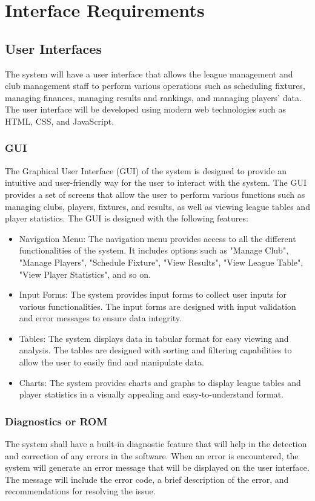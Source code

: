 \documentclass[12pt]{article}
\begin{document}
\section{Interface Requirements} 
\subsection{User Interfaces}
The system will have a user interface that allows the league management and club management staff to perform various operations such as scheduling fixtures, managing finances, managing results and rankings, and managing players' data. The user interface will be developed using modern web technologies such as HTML, CSS, and JavaScript.
\subsubsection {GUI}
The Graphical User Interface (GUI) of the system is designed to provide an intuitive and user-friendly way for the user to interact with the system. The GUI provides a set of screens that allow the user to perform various functions such as managing clubs, players, fixtures, and results, as well as viewing league tables and player statistics. The GUI is designed with the following features:
\begin{itemize}
    \item Navigation Menu: The navigation menu provides access to all the different functionalities of the system. It includes options such as "Manage Club", "Manage Players", "Schedule Fixture", "View Results", "View League Table", "View Player Statistics", and so on.
    \item Input Forms: The system provides input forms to collect user inputs for various functionalities. The input forms are designed with input validation and error messages to ensure data integrity.
    \item Tables: The system displays data in tabular format for easy viewing and analysis. The tables are designed with sorting and filtering capabilities to allow the user to easily find and manipulate data.
    \item Charts: The system provides charts and graphs to display league tables and player statistics in a visually appealing and easy-to-understand format.
\end{itemize}
\subsubsection {Diagnostics or ROM}
The system shall have a built-in diagnostic feature that will help in the detection and correction of any errors in the software. When an error is encountered, the system will generate an error message that will be displayed on the user interface. The message will include the error code, a brief description of the error, and recommendations for resolving the issue.
\end{document}
